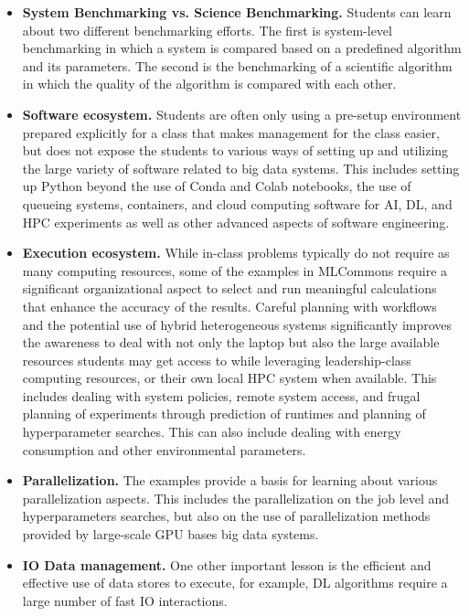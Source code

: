 \documentclass[utf8]{FrontiersinVancouver} %
\begin{document}
{\begin{itemize}
  \item {\bf System Benchmarking vs. Science Benchmarking.} Students
    can learn about two different benchmarking efforts. The first is
    system-level benchmarking in which a system is compared based
    on a predefined algorithm and its parameters. The second is the
    benchmarking of a scientific algorithm in which the quality of the
    algorithm is compared with each other.

  \item {\bf Software ecosystem.} Students are often only using a
    pre-setup environment prepared explicitly for a class that makes
    management for the class easier, but does not expose the students
    to various ways of setting up and utilizing the large variety of
    software related to big data systems. This includes setting up
    Python beyond the use of Conda and Colab notebooks, the use of
    queueing systems, containers, and cloud computing software for
    AI, DL, and HPC experiments as well as other advanced aspects of
    software engineering.

  \item {\bf Execution ecosystem.} While in-class problems typically
    do not require as many computing resources, some of the examples in
    MLCommons require a significant organizational aspect to select
    and run meaningful calculations that enhance the accuracy of the
    results. Careful planning with workflows and the potential use
    of hybrid heterogeneous systems significantly improves the
    awareness to deal with not only the laptop but also the large
    available resources students may get access to while leveraging
    leadership-class computing resources, or their own local HPC
    system when available. This includes dealing with system policies,
    remote system access, and frugal planning of experiments through
    prediction of runtimes and planning of hyperparameter searches. This
    can also include dealing with energy consumption and other
    environmental parameters.

  \item {\bf Parallelization.} The examples provide a basis for
    learning about various parallelization aspects. This includes the
    parallelization on the job level and hyperparameters searches, but
    also on the use of parallelization methods provided by large-scale
    GPU bases big data systems.

  \item {\bf IO Data management.} One other important lesson is the
    efficient and effective use of data stores to execute, for example,
    DL algorithms require a large number of fast IO interactions.


\end{itemize}}
\end{document}

